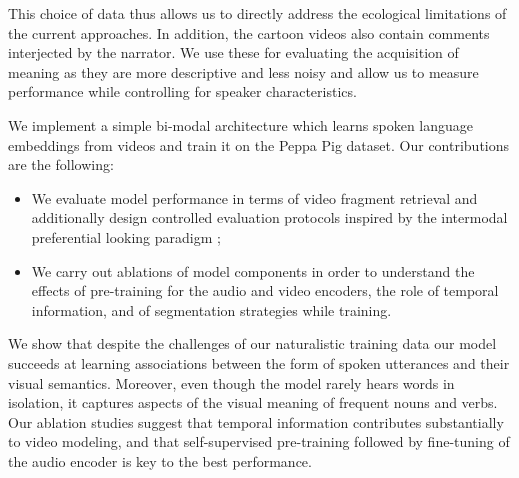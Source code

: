 This choice of data thus allows us to directly address the ecological limitations 
of the current approaches. In addition, the cartoon videos also contain 
comments interjected by the narrator. We use these for evaluating the 
acquisition of meaning as they are more descriptive and less noisy and allow 
us to measure performance while controlling for speaker characteristics.


We implement a simple bi-modal architecture which learns spoken
language embeddings from videos and train it on the Peppa Pig dataset.
Our contributions are the following:
\begin{itemize}
\item We evaluate model performance in terms of video fragment
  retrieval and additionally design controlled evaluation
  protocols inspired by the intermodal preferential looking
  paradigm \citep{hirsh1996intermodal};
\item We carry out ablations of model components in order to
  understand the effects of pre-training for the audio and video
  encoders, the role of temporal information, and of segmentation
  strategies while training. 
\end{itemize}
We show that despite the challenges of our naturalistic training data
our model succeeds at learning associations between the form of spoken 
utterances and their visual semantics. Moreover, even though the model 
rarely hears words in isolation, it captures aspects of the visual meaning 
of frequent nouns and verbs.
%
Our ablation studies suggest that temporal information contributes
substantially to video modeling, and that self-supervised pre-training
followed by fine-tuning of the audio encoder is key to the best
performance.



